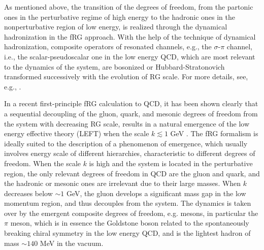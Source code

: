 \documentclass[%
reprint,
superscriptaddress,
showpacs,preprintnumbers,
 amsmath,amssymb,
 aps,
prd,
]{revtex4-1}
\begin{document}
As mentioned above, the transition of the degrees of freedom, from the partonic ones in the perturbative regime of high energy to the hadronic ones in the nonperturbative region of low energy, is realized through the dynamical hadronization in the fRG approach. With the help of the technique of dynamical hadronization, composite operators of resonated channels, e.g., the $\sigma$-$\pi$ channel, i.e., the scalar-pseudoscalar one in the low energy QCD, which are most relevant to the dynamics of the system, are bosonized or Hubbard-Stratonovich transformed successively with the evolution of RG scale. For more details, see, e.g., \cite{Gies:2001nw,Gies:2002hq,Pawlowski:2005xe,Floerchinger:2009uf,Fu:2019hdw}. 

In a recent first-principle fRG calculation to QCD, it has been shown clearly that a sequential decoupling of the gluon, quark, and mesonic degrees of freedom from the system with decreasing RG scale, results in a natural emergence of the low energy effective theory (LEFT) when the scale $k\lesssim 1$ GeV \cite{Fu:2019hdw}. The fRG formalism is ideally suited to the description of a phenomenon of emergence, which usually involves energy scale of different hierarchies, characteristic to different degrees of freedom. When the scale $k$ is high and the system is located in the perturbative region, the only relevant degrees of freedom in QCD are the gluon and quark, and the hadronic or mesonic ones are irrelevant due to their large masses. When $k$ decreases below $\sim 1$ GeV, the gluon develops a significant mass gap in the low momentum region, and thus decouples from the system. The dynamics is taken over by the emergent composite degrees of freedom, e.g. mesons, in particular the $\pi$ meson, which is in essence the Goldstone boson related to the spontaneously breaking chiral symmetry in the low energy QCD, and is the lightest hadron of mass $\sim 140$ MeV in the vacuum. 
\end{document}
